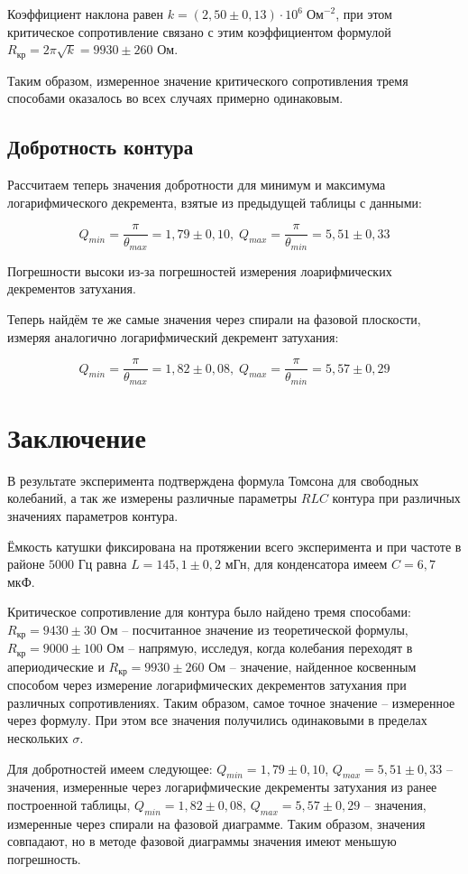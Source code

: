 Коэффициент наклона равен $k = (2,50 \pm 0,13) \cdot 10^6 \; \text{Ом}^{-2}$, при этом критическое сопротивление связано с этим коэффициентом формулой $R_{\text{кр}} = 2 \pi \sqrt{k} = 9930 \pm 260$ Ом.

Таким образом, измеренное значение критического сопротивления тремя способами оказалось во всех случаях примерно одинаковым.

\subsection{Добротность контура}

Рассчитаем теперь значения добротности для минимум и максимума логарифмического декремента, взятые из предыдущей таблицы с данными:

\begin{equation}
    Q_{min} = \frac{\pi}{\theta_{max}} = 1,79 \pm 0,10, \;
    Q_{max} = \frac{\pi}{\theta_{min}} = 5,51 \pm 0,33
\end{equation}

Погрешности высоки из-за погрешностей измерения лоарифмических декрементов затухания.

Теперь найдём те же самые значения через спирали на фазовой плоскости, измеряя аналогично логарифмический декремент затухания:

\begin{equation}
    Q_{min} = \frac{\pi}{\theta_{max}} = 1,82 \pm 0,08, \;
    Q_{max} = \frac{\pi}{\theta_{min}} = 5,57 \pm 0,29
\end{equation}

\section{Заключение}

В результате эксперимента подтверждена формула Томсона для свободных колебаний, а так же измерены различные параметры $RLC$ контура при различных значениях параметров контура.

Ёмкость катушки фиксирована на протяжении всего эксперимента и при частоте в районе $5000$ Гц равна $L = 145,1 \pm 0,2$ мГн, для конденсатора имеем $C = 6,7$ мкФ.

Критическое сопротивление для контура было найдено тремя способами: $R_{\text{кр}} = 9430 \pm 30$ Ом -- посчитанное значение из теоретической формулы, $R_{\text{кр}} = 9000 \pm 100$ Ом -- напрямую, исследуя, когда колебания переходят в апериодические и $R_{\text{кр}} = 9930 \pm 260$ Ом -- значение, найденное косвенным способом через измерение логарифмических декрементов затухания при различных сопротивлениях. Таким образом, самое точное значение -- измеренное через формулу. При этом все значения получились одинаковыми в пределах нескольких $\sigma$.

Для добротностей имеем следующее: $Q_{min} = 1,79 \pm 0,10$, $Q_{max} = 5,51 \pm 0,33$ -- значения, измеренные через логарифмические декременты затухания из ранее построенной таблицы,  $Q_{min} = 1,82 \pm 0,08$, $Q_{max} = 5,57 \pm 0,29$ -- значения, измеренные через спирали на фазовой диаграмме. Таким образом, значения совпадают, но в методе фазовой диаграммы значения имеют меньшую погрешность.
